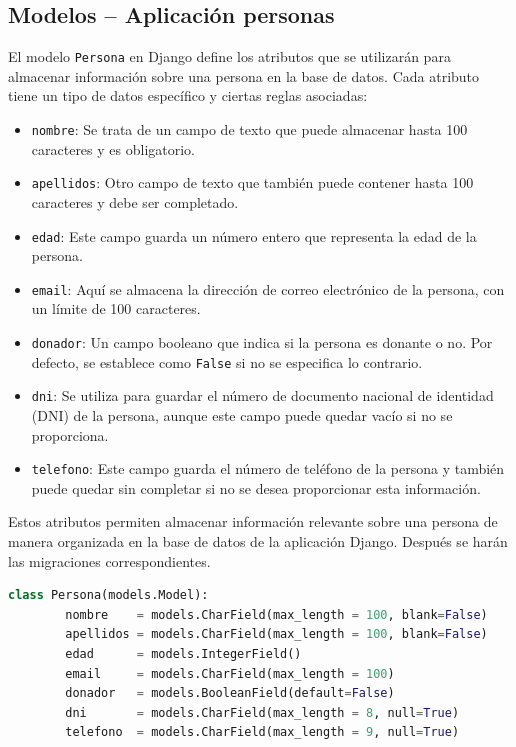 \documentclass{article}
\begin{document}
  \subsection{Modelos -- Aplicación personas}
    El modelo \texttt{Persona} en Django define los atributos que se utilizarán para almacenar información sobre una persona en la base de datos. Cada atributo tiene un tipo de datos específico y ciertas reglas asociadas:
    \begin{itemize}
        \item \texttt{nombre}: Se trata de un campo de texto que puede almacenar hasta 100 caracteres y es obligatorio.
        \item \texttt{apellidos}: Otro campo de texto que también puede contener hasta 100 caracteres y debe ser completado.
        \item \texttt{edad}: Este campo guarda un número entero que representa la edad de la persona.
        \item \texttt{email}: Aquí se almacena la dirección de correo electrónico de la persona, con un límite de 100 caracteres.
        \item \texttt{donador}: Un campo booleano que indica si la persona es donante o no. Por defecto, se establece como \texttt{False} si no se especifica lo contrario.
        \item \texttt{dni}: Se utiliza para guardar el número de documento nacional de identidad (DNI) de la persona, aunque este campo puede quedar vacío si no se proporciona.
        \item \texttt{telefono}: Este campo guarda el número de teléfono de la persona y también puede quedar sin completar si no se desea proporcionar esta información.
    \end{itemize}
    Estos atributos permiten almacenar información relevante sobre una persona de manera organizada en la base de datos de la aplicación Django. Después se harán las migraciones 
    correspondientes.
    \begin{lstlisting}[language=Python, caption={Modelo Persona}]
      class Persona(models.Model):
        nombre    = models.CharField(max_length = 100, blank=False)
        apellidos = models.CharField(max_length = 100, blank=False)
        edad      = models.IntegerField()
        email     = models.CharField(max_length = 100)
        donador   = models.BooleanField(default=False)
        dni       = models.CharField(max_length = 8, null=True)
        telefono  = models.CharField(max_length = 9, null=True)
    \end{lstlisting}
    \newpage
    
\end{document}
